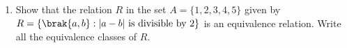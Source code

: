 \begin{enumerate}
\item Show that the relation $R$ in the set $A = \{1,2,3,4,5\}$ given by $R = \{\brak{a,b} : |a-b| \text{ is divisible by 2}\}$ is an equivalence relation. Write all the equivalence classes of $R$.
\end{enumerate}
